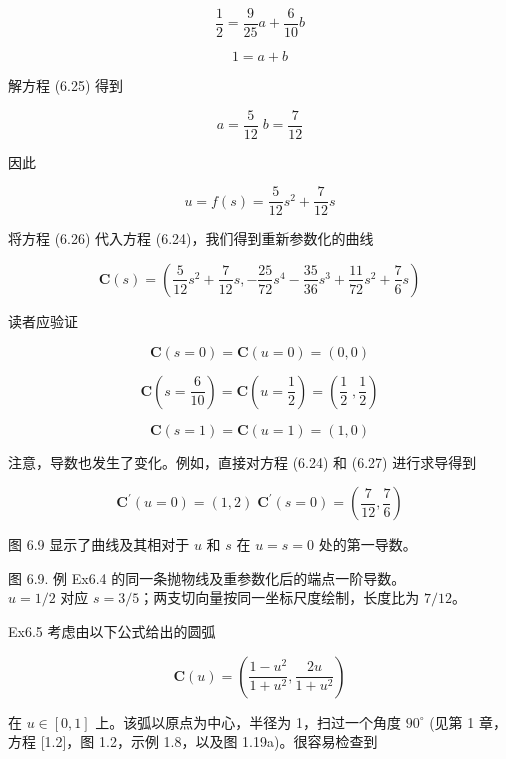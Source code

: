 \documentclass[../main.tex]{subfiles}
\begin{document}
\[
\frac{1}{2} = \frac{9}{25}a + \frac{6}{10}b
\]

\[
1 = a + b \tag{6.25}
\]

解方程 (6.25) 得到

\[
a = \frac{5}{12}\;b = \frac{7}{12}
\]

因此

\[
u = f\left( s\right)  = \frac{5}{12}{s}^{2} + \frac{7}{12}s \tag{6.26}
\]

将方程 (6.26) 代入方程 (6.24)，我们得到重新参数化的曲线

\[
\mathbf{C}\left( s\right)  = \left( {\frac{5}{12}{s}^{2} + \frac{7}{12}s, - \frac{25}{72}{s}^{4} - \frac{35}{36}{s}^{3} + \frac{11}{72}{s}^{2} + \frac{7}{6}s}\right)  \tag{6.27}
\]

读者应验证

\[
\mathbf{C}\left( {s = 0}\right)  = \mathbf{C}\left( {u = 0}\right)  = \left( {0,0}\right)
\]

\[
\mathbf{C}\left( {s = \frac{6}{10}}\right)  = \mathbf{C}\left( {u = \frac{1}{2}}\right)  = \left( {\frac{1}{2}\;,\frac{1}{2}}\right)
\]

\[
\mathbf{C}\left( {s = 1}\right)  = \mathbf{C}\left( {u = 1}\right)  = \left( {1,0}\right)
\]

注意，导数也发生了变化。例如，直接对方程 (6.24) 和 (6.27) 进行求导得到

\[
{\mathbf{C}}^{\prime }\left( {u = 0}\right)  = \left( {1,2}\right) \;{\mathbf{C}}^{\prime }\left( {s = 0}\right)  = \left( {\frac{7}{12},\frac{7}{6}}\right)
\]

图 6.9 显示了曲线及其相对于 \(u\) 和 \(s\) 在 \(u = s = 0\) 处的第一导数。

\begin{center}
\begin{minipage}{17cm}
\vspace*{.6\baselineskip}
\centering
{}
\par\smallskip
图 6.9. 例 Ex6.4 的同一条抛物线及重参数化后的端点一阶导数。\\
$u=1/2$ 对应 $s=3/5$；两支切向量按同一坐标尺度绘制，长度比为 $7/12$。
\end{minipage}
\end{center}

Ex6.5 考虑由以下公式给出的圆弧

\[
\mathbf{C}\left( u\right)  = \left( {\frac{1 - {u}^{2}}{1 + {u}^{2}},\frac{2u}{1 + {u}^{2}}}\right)  \tag{6.28}
\]

在 \(u \in  \left\lbrack  {0,1}\right\rbrack\) 上。该弧以原点为中心，半径为 1，扫过一个角度 \({90}^{ \circ  }\) (见第 1 章，方程 [1.2]，图 1.2，示例 1.8，以及图 1.19a)。很容易检查到
\end{document}
